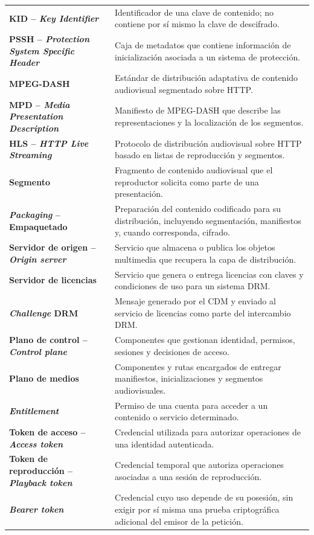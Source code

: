 \begin{longtable}{@{}>{\raggedright\arraybackslash\bfseries}p{}>{\raggedright\arraybackslash}p{}@{}}
KID -- \textit{Key Identifier} & Identificador de una clave de contenido; no contiene por sí mismo la clave de descifrado. \\
PSSH -- \textit{Protection System Specific Header} & Caja de metadatos que contiene información de inicialización asociada a un sistema de protección. \\
MPEG-DASH & Estándar de distribución adaptativa de contenido audiovisual segmentado sobre HTTP. \\
MPD -- \textit{Media Presentation Description} & Manifiesto de MPEG-DASH que describe las representaciones y la localización de los segmentos. \\
HLS -- \textit{HTTP Live Streaming} & Protocolo de distribución audiovisual sobre HTTP basado en listas de reproducción y segmentos. \\
Segmento & Fragmento de contenido audiovisual que el reproductor solicita como parte de una presentación. \\
\textit{Packaging} -- Empaquetado & Preparación del contenido codificado para su distribución, incluyendo segmentación, manifiestos y, cuando corresponda, cifrado. \\
Servidor de origen -- \textit{Origin server} & Servicio que almacena o publica los objetos multimedia que recupera la capa de distribución. \\
Servidor de licencias & Servicio que genera o entrega licencias con claves y condiciones de uso para un sistema DRM. \\
\textit{Challenge} DRM & Mensaje generado por el CDM y enviado al servicio de licencias como parte del intercambio DRM. \\
Plano de control -- \textit{Control plane} & Componentes que gestionan identidad, permisos, sesiones y decisiones de acceso. \\
Plano de medios & Componentes y rutas encargados de entregar manifiestos, inicializaciones y segmentos audiovisuales. \\
\textit{Entitlement} & Permiso de una cuenta para acceder a un contenido o servicio determinado. \\
Token de acceso -- \textit{Access token} & Credencial utilizada para autorizar operaciones de una identidad autenticada. \\
Token de reproducción -- \textit{Playback token} & Credencial temporal que autoriza operaciones asociadas a una sesión de reproducción. \\
\textit{Bearer token} & Credencial cuyo uso depende de su posesión, sin exigir por sí misma una prueba criptográfica adicional del emisor de la petición. \\

\end{longtable}
